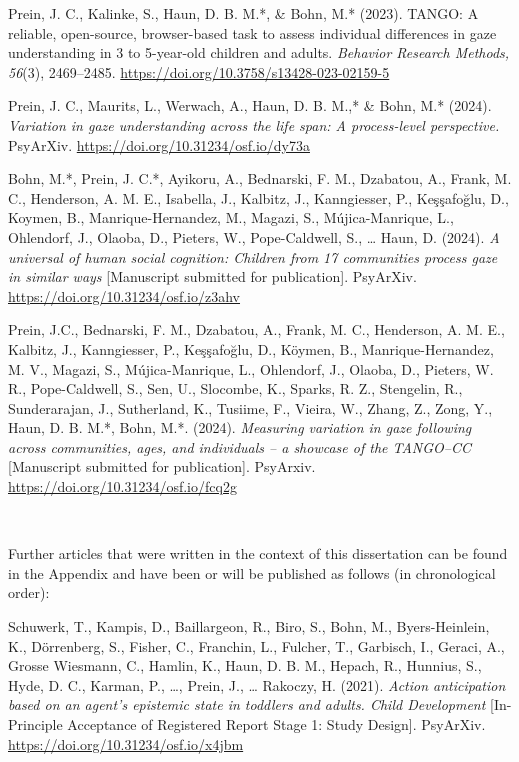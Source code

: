 \documentclass[
]{scrbook}
\begin{document}
Prein, J. C., Kalinke, S., Haun, D. B. M.*, \& Bohn, M.* (2023). TANGO: A reliable, open-source, browser-based task to assess individual differences in gaze understanding in 3 to 5-year-old children and adults. \emph{Behavior Research Methods, 56}(3), 2469--2485. \url{https://doi.org/10.3758/s13428-023-02159-5}

Prein, J. C., Maurits, L., Werwach, A., Haun, D. B. M.,* \& Bohn, M.* (2024). \emph{Variation in gaze understanding across the life span: A process-level perspective.} PsyArXiv. \url{https://doi.org/10.31234/osf.io/dy73a}

Bohn, M.*, Prein, J. C.*, Ayikoru, A., Bednarski, F. M., Dzabatou, A., Frank, M. C., Henderson, A. M. E., Isabella, J., Kalbitz, J., Kanngiesser, P., Keşşafoğlu, D., Koymen, B., Manrique-Hernandez, M., Magazi, S., Mújica-Manrique, L., Ohlendorf, J., Olaoba, D., Pieters, W., Pope-Caldwell, S., \ldots{} Haun, D. (2024). \emph{A universal of human social cognition: Children from 17 communities process gaze in similar ways} {[}Manuscript submitted for publication{]}. PsyArXiv. \url{https://doi.org/10.31234/osf.io/z3ahv}

Prein, J.C., Bednarski, F. M., Dzabatou, A., Frank, M. C., Henderson, A. M. E., Kalbitz, J., Kanngiesser, P., Keşşafoğlu, D., Köymen, B., Manrique-Hernandez, M. V., Magazi, S., Mújica-Manrique, L., Ohlendorf, J., Olaoba, D., Pieters, W. R., Pope-Caldwell, S., Sen, U., Slocombe, K., Sparks, R. Z., Stengelin, R., Sunderarajan, J., Sutherland, K., Tusiime, F., Vieira, W., Zhang, Z., Zong, Y., Haun, D. B. M.*, Bohn, M.*. (2024). \emph{Measuring variation in gaze following across communities, ages, and individuals -- a showcase of the TANGO--CC} {[}Manuscript submitted for publication{]}. PsyArxiv. \url{https://doi.org/10.31234/osf.io/fcq2g}

~

Further articles that were written in the context of this dissertation can be found in the Appendix and have been or will be published as follows (in chronological order):

Schuwerk, T., Kampis, D., Baillargeon, R., Biro, S., Bohn, M., Byers-Heinlein, K., Dörrenberg, S., Fisher, C., Franchin, L., Fulcher, T., Garbisch, I., Geraci, A., Grosse Wiesmann, C., Hamlin, K., Haun, D. B. M., Hepach, R., Hunnius, S., Hyde, D. C., Karman, P., \ldots, Prein, J., \ldots{} Rakoczy, H. (2021). \emph{Action anticipation based on an agent's epistemic state in toddlers and adults. Child Development} {[}In-Principle Acceptance of Registered Report Stage 1: Study Design{]}. PsyArXiv. \url{https://doi.org/10.31234/osf.io/x4jbm}
\end{document}

